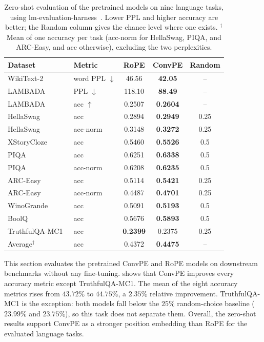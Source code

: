 \documentclass{article}
\begin{document}
\begin{table}[!ht]
\centering
\small
\begin{tabular}{llccc}
\toprule
Dataset & Metric & RoPE & ConvPE & Random \\
\midrule
WikiText-2 & word PPL $\downarrow$ & 46.56 & \textbf{42.05} & -- \\
LAMBADA~\cite{paperno2016lambada} & PPL $\downarrow$ & 118.10 & \textbf{88.49} & -- \\
LAMBADA & acc $\uparrow$ & 0.2507 & \textbf{0.2604} & -- \\
HellaSwag~\cite{zellers2019hellaswag} & acc & 0.2894 & \textbf{0.2949} & 0.25 \\
HellaSwag & acc-norm & 0.3148 & \textbf{0.3272} & 0.25 \\
XStoryCloze~\cite{lin2022xstorycloze} & acc & 0.5460 & \textbf{0.5526} & 0.5 \\
PIQA~\cite{bisk2020piqa} & acc & 0.6251 & \textbf{0.6338} & 0.5 \\
PIQA & acc-norm & 0.6208 & \textbf{0.6235} & 0.5 \\
ARC-Easy~\cite{clark2018arc} & acc & 0.5114 & \textbf{0.5421} & 0.25 \\
ARC-Easy & acc-norm & 0.4487 & \textbf{0.4701} & 0.25 \\
WinoGrande~\cite{sakaguchi2019winogrande} & acc & 0.5091 & \textbf{0.5193} & 0.5 \\
BoolQ~\cite{clark2019boolq} & acc & 0.5676 & \textbf{0.5893} & 0.5 \\
TruthfulQA-MC1~\cite{lin2021truthfulqa} & acc & \textbf{0.2399} & 0.2375 & 0.25 \\
\midrule
Average$^\dagger$ & acc & 0.4372 & \textbf{0.4475} & -- \\
\bottomrule
\end{tabular}
\caption{Zero-shot evaluation of the pretrained models on nine language tasks, using lm-evaluation-harness~\cite{gao2023lmeval}. Lower PPL and higher accuracy are better; the Random column gives the chance level where one exists. $^\dagger$Mean of one accuracy per task (acc-norm for HellaSwag, PIQA, and ARC-Easy, and acc otherwise), excluding the two perplexities.}
\label{tab:pe}
\end{table}

This section evaluates the pretrained ConvPE and RoPE models on downstream benchmarks without any fine-tuning.  shows that ConvPE improves every accuracy metric except TruthfulQA-MC1. The mean of the eight accuracy metrics rises from $43.72\%$ to $44.75\%$, a $2.35\%$ relative improvement. TruthfulQA-MC1 is the exception: both models fall below the $25\%$ random-choice baseline ($23.99\%$ and $23.75\%$), so this task does not separate them. Overall, the zero-shot results support ConvPE as a stronger position embedding than RoPE for the evaluated language tasks.
\end{document}
